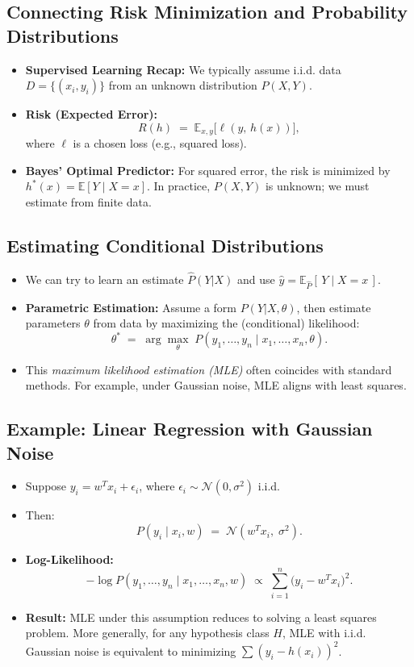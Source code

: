 \documentclass[twocolumn]{article}
\begin{document}
\begin{spacing}{1}
\subsection{Connecting Risk Minimization and Probability Distributions}
\begin{itemize}
    \item \textbf{Supervised Learning Recap:} We typically assume i.i.d. data $D = \{(x_i, y_i)\}$ from an unknown distribution $P(X,Y)$.
    \item \textbf{Risk (Expected Error):}
    \[
        R(h) \;=\; \mathbb{E}_{x,y}\!\big[\ell(y,\,h(x))\big],
    \]
    where $\ell$ is a chosen loss (e.g., squared loss).
    \item \textbf{Bayes’ Optimal Predictor:} For squared error, the risk is minimized by $h^*(x) = \mathbb{E}[Y \mid X=x]$. In practice, $P(X,Y)$ is unknown; we must estimate from finite data.
\end{itemize}

\subsection{Estimating Conditional Distributions}
\begin{itemize}
    \item We can try to learn an estimate $\hat P(Y|X)$ and use $\hat{y} = \mathbb{E}_{\hat P}[\,Y \mid X=x\,]$.
    \item \textbf{Parametric Estimation:} Assume a form $P(Y|X,\theta)$, then estimate parameters $\theta$ from data by maximizing the (conditional) likelihood:
    \[
        \theta^* \;=\; \arg\max_\theta \; P(y_1,\dots,y_n \mid x_1,\dots,x_n,\theta).
    \]
    \item This \emph{maximum likelihood estimation (MLE)} often coincides with standard methods. For example, under Gaussian noise, MLE aligns with least squares.
\end{itemize}

\subsection{Example: Linear Regression with Gaussian Noise}
\begin{itemize}
    \item Suppose $y_i = w^T x_i + \epsilon_i$, where $\epsilon_i \sim \mathcal{N}(0,\sigma^2)$ i.i.d.
    \item Then:
    \[
        P(y_i \mid x_i, w) \;=\; \mathcal{N}(w^T x_i,\; \sigma^2).
    \]
    \item \textbf{Log-Likelihood:}
    \[
        -\log P(y_1,\dots,y_n \mid x_1,\dots,x_n, w)
        \;\propto\; \sum_{i=1}^n \bigl(y_i - w^T x_i\bigr)^2.
    \]
    \item \textbf{Result:} MLE under this assumption reduces to solving a least squares problem. More generally, for any hypothesis class $H$, MLE with i.i.d. Gaussian noise is equivalent to minimizing $\sum (y_i - h(x_i))^2$.
\end{itemize}


\end{spacing}
\end{document}
